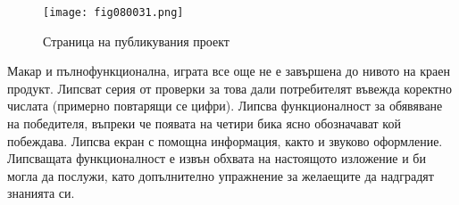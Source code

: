 \begin{figure}[H]
  \centering
  \texttt{[image: fig080031.png]}
  \caption{Страница на публикувания проект}
\label{fig080031}
\end{figure}

Макар и пълнофункционална, играта все още не е завършена до нивото на краен продукт. Липсват серия от проверки за това дали потребителят въвежда коректно числата (примерно повтарящи се цифри). Липсва функционалност за обявяване на победителя, въпреки че появата на четири бика ясно обозначават кой побеждава. Липсва екран с помощна информация, както и звуково оформление. Липсващата функционалност е извън обхвата на настоящото изложение и би могла да послужи, като допълнително упражнение за желаещите да надградят знанията си.

